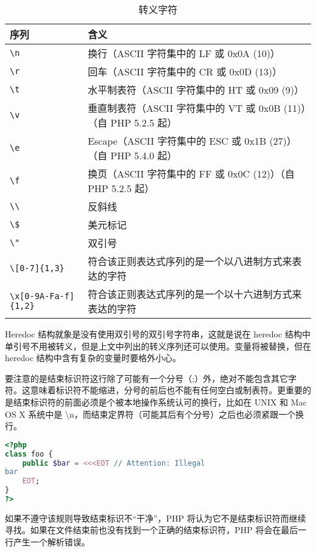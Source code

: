 \begin{table}[!ht]
\centering
\caption{转义字符}
\begin{tabular}{|l|l|}
\hline
序列	&含义\\
\hline
\texttt{\textbackslash n}	&换行（ASCII 字符集中的 LF 或 0x0A (10)）\\
\hline
\texttt{\textbackslash r}	&回车（ASCII 字符集中的 CR 或 0x0D (13)）\\
\hline
\texttt{\textbackslash t}	&水平制表符（ASCII 字符集中的 HT 或 0x09 (9)）\\
\hline
\texttt{\textbackslash v}	&垂直制表符（ASCII 字符集中的 VT 或 0x0B (11)）（自 PHP 5.2.5 起）\\
\hline
\texttt{\textbackslash e}	&Escape（ASCII 字符集中的 ESC 或 0x1B (27)）（自 PHP 5.4.0 起）\\
\hline
\texttt{\textbackslash f}	&换页（ASCII 字符集中的 FF 或 0x0C (12)）（自 PHP 5.2.5 起）\\
\hline
\texttt{\textbackslash \textbackslash}	&反斜线\\
\hline
\texttt{\textbackslash \$}	&美元标记\\
\hline
\texttt{\textbackslash "}	&双引号\\
\hline
\texttt{\textbackslash [0-7]\{1,3\}}	 &符合该正则表达式序列的是一个以八进制方式来表达的字符\\
\hline
\texttt{\textbackslash x[0-9A-Fa-f]\{1,2\}}	 &符合该正则表达式序列的是一个以十六进制方式来表达的字符\\
\hline
\end{tabular}
\end{table}


Heredoc 结构就象是没有使用双引号的双引号字符串，这就是说在 heredoc 结构中单引号不用被转义，但是上文中列出的转义序列还可以使用。变量将被替换，但在 heredoc 结构中含有复杂的变量时要格外小心。

要注意的是结束标识符这行除了可能有一个分号（;）外，绝对不能包含其它字符。这意味着标识符不能缩进，分号的前后也不能有任何空白或制表符。更重要的是结束标识符的前面必须是个被本地操作系统认可的换行，比如在 UNIX 和 Mac OS X 系统中是 \textbackslash n，而结束定界符（可能其后有个分号）之后也必须紧跟一个换行。

\begin{lstlisting}[language=PHP]
<?php
class foo {
    public $bar = <<<EOT // Attention: Illegal
bar
    EOT;
}
?>
\end{lstlisting}

如果不遵守该规则导致结束标识不“干净”，PHP 将认为它不是结束标识符而继续寻找。如果在文件结束前也没有找到一个正确的结束标识符，PHP 将会在最后一行产生一个解析错误。


